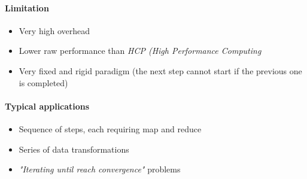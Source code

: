 \paragraph{Limitation}
\begin{itemize}
    \item Very high overhead
    \item Lower raw performance than \textit{HCP (High Performance Computing}
    \item Very fixed and rigid paradigm (the next step cannot start if the previous one is completed)
\end{itemize}

\paragraph{Typical applications}
\begin{itemize}
    \item Sequence of steps, each requiring map and reduce
    \item Series of data transformations
    \item \textit{"Iterating until reach convergence"} problems
\end{itemize}